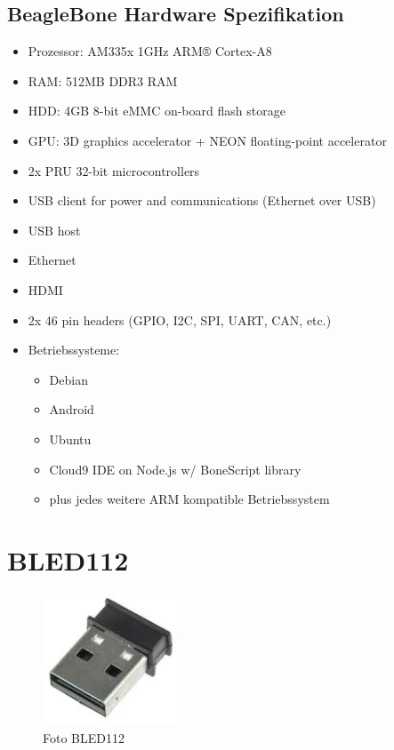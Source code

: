 \subsection{BeagleBone Hardware Spezifikation}
\begin{itemize}
	\itemsep 1pt \parskip 0pt \parsep 0pt
	\item Prozessor:	AM335x 1GHz ARM® Cortex-A8
	\item RAM:			512MB DDR3 RAM
	\item HDD:			4GB 8-bit eMMC on-board flash storage
	\item GPU:  		3D graphics accelerator + NEON floating-point accelerator
	\item 2x PRU 32-bit microcontrollers
	\item USB client for power and communications (Ethernet over USB)
	\item USB host
	\item Ethernet
	\item HDMI
	\item 2x 46 pin headers (GPIO, I2C, SPI, UART, CAN, etc.)
	\item Betriebssysteme:
	\begin{itemize}
		\itemsep 1pt \parskip 0pt \parsep 0pt
		\item Debian
		\item Android
		\item Ubuntu
		\item Cloud9 IDE on Node.js w/ BoneScript library
		\item plus jedes weitere ARM kompatible Betriebssystem
	\end{itemize}		
\end{itemize}



\section{BLED112}

\begin{figure}[hbtp]
	\center
	\includegraphics[width=4cm]{bilder/bled112.jpg}
	\caption{Foto BLED112}
	\label{fig:bled112}
\end{figure}


